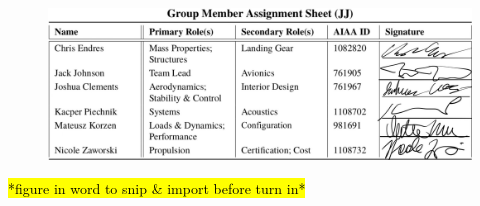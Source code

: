 \documentclass[conf]{new-aiaa}
\begin{document}


\newpage

\begin{figure}[!h]
    \centering
    \includegraphics[width=\linewidth]{Photos/signatures.JPG}
    \label{fig:my_label}
\end{figure}

\hl{*figure in word to snip \& import before turn in*}

\end{document}
